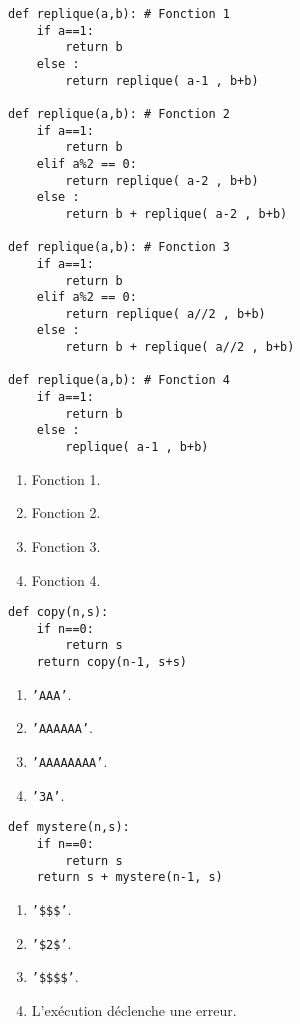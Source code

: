 \begin{lstlisting}
def replique(a,b): # Fonction 1
    if a==1:
        return b
    else :
        return replique( a-1 , b+b)

def replique(a,b): # Fonction 2
    if a==1:
        return b
    elif a%2 == 0:
        return replique( a-2 , b+b)
    else :
        return b + replique( a-2 , b+b)

def replique(a,b): # Fonction 3
    if a==1:
        return b
    elif a%2 == 0:
        return replique( a//2 , b+b)
    else :
        return b + replique( a//2 , b+b)

def replique(a,b): # Fonction 4
    if a==1:
        return b
    else :
        replique( a-1 , b+b)
\end{lstlisting}

\begin{enumerate}
\item Fonction 1.
\item Fonction 2.
\item Fonction 3.
\item Fonction 4.
\end{enumerate}

\begin{lstlisting}
def copy(n,s):
    if n==0:
        return s
    return copy(n-1, s+s)
\end{lstlisting}

\begin{enumerate}
\item \texttt{'AAA'}.
\item \texttt{'AAAAAA'}.
\item \texttt{'AAAAAAAA'}.
\item \texttt{'3A'}.
\end{enumerate}

\begin{lstlisting}
def mystere(n,s):
    if n==0:
        return s
    return s + mystere(n-1, s)
\end{lstlisting}

\begin{enumerate}
\item \texttt{'\$\$\$'}.
\item \texttt{'\$2\$'}.
\item \texttt{'\$\$\$\$'}. %
\item L'exécution déclenche une erreur.
\end{enumerate}

